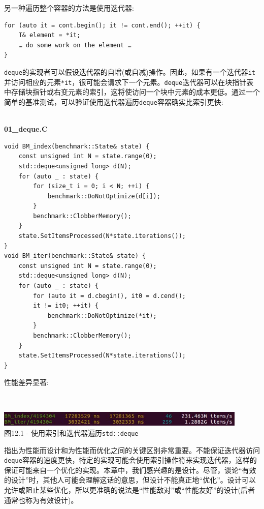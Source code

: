 另一种遍历整个容器的方法是使用迭代器:

\begin{lstlisting}[style=styleCXX]
for (auto it = cont.begin(); it != cont.end(); ++it) {
	T& element = *it;
	… do some work on the element …
}
\end{lstlisting}

\texttt{deque}的实现者可以假设迭代器的自增(或自减)操作。因此，如果有一个迭代器\texttt{it}并访问相应的元素\texttt{*it}，很可能会请求下一个元素。\texttt{deque}迭代器可以在块指针表中存储块指针或右变元素的索引，这将使访问一个块中元素的成本更低。通过一个简单的基准测试，可以验证使用迭代器遍历\texttt{deque}容器确实比索引更快:

\hspace*{\fill} \\ %
\noindent
\textbf{01\_deque.C}
\begin{lstlisting}[style=styleCXX]
void BM_index(benchmark::State& state) {
	const unsigned int N = state.range(0);
	std::deque<unsigned long> d(N);
	for (auto _ : state) {
		for (size_t i = 0; i < N; ++i) {
			benchmark::DoNotOptimize(d[i]);
		}
		benchmark::ClobberMemory();
	}
	state.SetItemsProcessed(N*state.iterations());
}
void BM_iter(benchmark::State& state) {
	const unsigned int N = state.range(0);
	std::deque<unsigned long> d(N);
	for (auto _ : state) {
		for (auto it = d.cbegin(), it0 = d.cend(); 
		it != it0; ++it) {
			benchmark::DoNotOptimize(*it);
		}
		benchmark::ClobberMemory();
	}
	state.SetItemsProcessed(N*state.iterations());
}
\end{lstlisting}

性能差异显著:

\hspace*{\fill} \\ %
\begin{center}
\includegraphics[width=0.9\textwidth]{content/3/chapter12/images/1.jpg}\\
图12.1 - 使用索引和迭代器遍历\texttt{std::deque}
\end{center}

指出为性能而设计和为性能而优化之间的关键区别非常重要。不能保证迭代器访问\texttt{deque}容器的速度更快，特定的实现可能会使用索引操作符来实现迭代器，这样的保证可能来自一个优化的实现。本章中，我们感兴趣的是设计。尽管，谈论“有效的设计”时，其他人可能会理解这话的意思，但设计不能真正地“优化”。设计可以允许或阻止某些优化，所以更准确的说法是“性能敌对”或“性能友好”的设计(后者通常也称为有效设计)。

